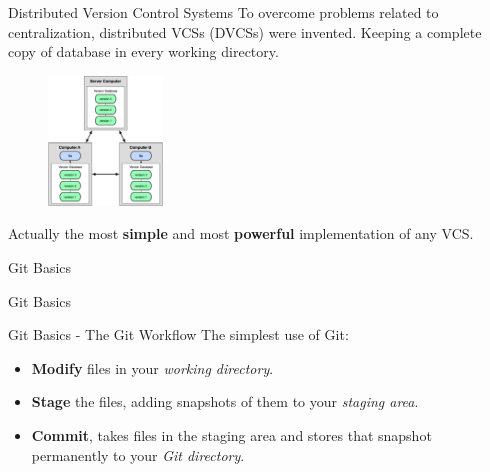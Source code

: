 \documentclass{beamer}
\def \figureHeight {130px}
\begin{document}
\begin{frame}{Distributed Version Control Systems}
To overcome problems related to centralization, distributed VCSs (DVCSs) were invented. Keeping a complete copy of database in every working directory.
\begin{figure}
   \includegraphics[height=\figureHeight]{images/distributed-version-control.png}
\end{figure}
Actually the most {\bf simple} and most {\bf powerful} implementation of any VCS.
\end{frame}

\begin{frame}{Git Basics}
	\begin{center}
		Git Basics
	\end{center}
\end{frame}

\begin{frame}{Git Basics - The Git Workflow}
The simplest use of Git:
\begin{itemize}
  \item {\bf Modify} files in your \emph{working directory}.
  \item {\bf Stage} the files, adding snapshots of them to your \emph{staging area}.
  \item {\bf Commit}, takes files in the staging area and stores that snapshot permanently to your \emph{Git directory}.
\end{itemize}
\end{frame}
\end{document}
